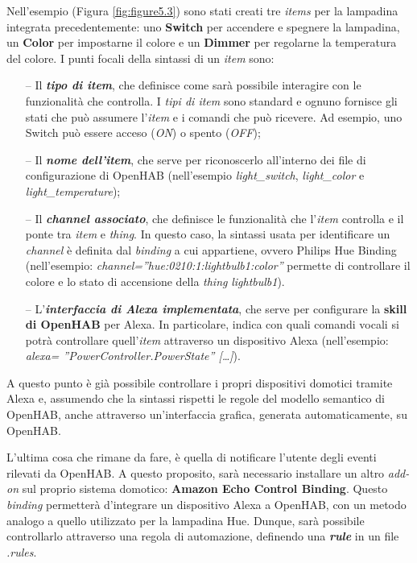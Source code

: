 Nell’esempio (Figura \ref{fig:figure5.3}) sono stati creati tre \textit{items}
per la lampadina integrata precedentemente: uno \textbf{Switch} per accendere e
spegnere la lampadina, un \textbf{Color} per impostarne il colore e un
\textbf{Dimmer} per regolarne la temperatura del colore. I punti focali della
sintassi di un \textit{item} sono:
\begin{itemize}
  \item[--] Il \textit{\textbf{tipo di item}}, che definisce come sarà
        possibile interagire con le funzionalità che controlla. I \textit{tipi
          di item} sono standard e ognuno fornisce gli stati che può assumere
        l’\textit{item} e i comandi che può ricevere. Ad esempio, uno Switch
        può essere acceso (\textit{ON}) o spento (\textit{OFF});
  \item[--] Il \textit{\textbf{nome dell’item}}, che serve per riconoscerlo
        all’interno dei file di configurazione di OpenHAB (nell’esempio
        \textit{light\_switch}, \textit{light\_color} e
        \textit{light\_temperature});
  \item[--] Il \textit{\textbf{channel associato}}, che definisce le
        funzionalità che l’\textit{item} controlla e il ponte tra
        \textit{item} e \textit{thing}. In questo caso, la sintassi usata per
        identificare un \textit{channel} è definita dal \textit{binding} a cui
        appartiene, ovvero Philips Hue Binding (nell’esempio:
        \textit{channel=”hue:0210:1:lightbulb1:color”} permette di controllare
        il colore e lo stato di accensione della \textit{thing}
        \textit{lightbulb1}).
  \item[--] L’\textit{\textbf{interfaccia di Alexa implementata}}, che serve
        per configurare la \textbf{skill di OpenHAB} per Alexa. In particolare,
        indica con quali comandi vocali si potrà controllare
        quell’\textit{item} attraverso un dispositivo Alexa (nell’esempio:
        \textit{alexa= ”PowerController.PowerState” […]}).
\end{itemize}

A questo punto è già possibile controllare i propri dispositivi domotici
tramite Alexa e, assumendo che la sintassi rispetti le regole del modello
semantico di OpenHAB, anche attraverso un'interfaccia grafica, generata
automaticamente, su OpenHAB.

L’ultima cosa che rimane da fare, è quella di notificare l’utente degli eventi
rilevati da OpenHAB. A questo proposito, sarà necessario installare un altro
\textit{add-on} sul proprio sistema domotico: \textbf{Amazon Echo Control
Binding}. Questo \textit{binding} permetterà d'integrare un dispositivo Alexa a
OpenHAB, con un metodo analogo a quello utilizzato per la lampadina Hue.
Dunque, sarà possibile controllarlo attraverso una regola di automazione,
definendo una \textit{\textbf{rule}} in un file \textit{.rules}.


